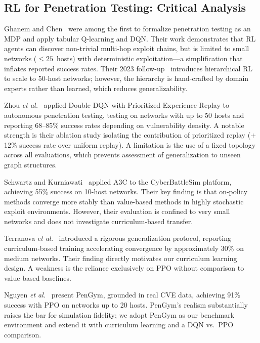 \documentclass[conference]{IEEEtran}
\begin{document}
\subsection{RL for Penetration Testing: Critical Analysis}

Ghanem and Chen~\cite{ghanem2020reinforcement} were among the first to
formalize penetration testing as an MDP and apply tabular Q-learning and
DQN.  Their work demonstrates that RL agents can discover non-trivial
multi-hop exploit chains, but is limited to small networks ($\leq
25$~hosts) with deterministic exploitation---a simplification that
inflates reported success rates.  Their 2023 follow-up~\cite{ghanem2023jiis}
introduces hierarchical RL to scale to 50-host networks; however, the
hierarchy is hand-crafted by domain experts rather than learned,
which reduces generalizability.

Zhou \emph{et al.}~\cite{zhou2021autonomous} applied Double DQN with
Prioritized Experience Replay to autonomous penetration testing, testing
on networks with up to 50 hosts and reporting 68--85\% success rates
depending on vulnerability density.  A notable strength is their
ablation study isolating the contribution of prioritized replay
($+$12\% success rate over uniform replay).  A limitation is the use of
a fixed topology across all evaluations, which prevents assessment of
generalization to unseen graph structures.

Schwartz and Kurniawati~\cite{schwartz2019autonomous} applied A3C to the
CyberBattleSim platform, achieving 55\% success on 10-host networks.
Their key finding is that on-policy methods converge more stably than
value-based methods in highly stochastic exploit environments.  However,
their evaluation is confined to very small networks and does not
investigate curriculum-based transfer.

Terranova \emph{et al.}~\cite{terranova2024raid} introduced a rigorous
generalization protocol, reporting curriculum-based training accelerating
convergence by approximately 30\% on medium networks.  Their finding
directly motivates our curriculum learning design.  A weakness is the
reliance exclusively on PPO without comparison to value-based baselines.

Nguyen \emph{et al.}~\cite{nguyen2025cose} present PenGym, grounded in
real CVE data, achieving 91\% success with PPO on networks up to 20
hosts.  PenGym's realism substantially raises the bar for simulation
fidelity; we adopt PenGym as our benchmark environment and extend it with curriculum learning and a DQN vs.\ PPO comparison.
\end{document}
